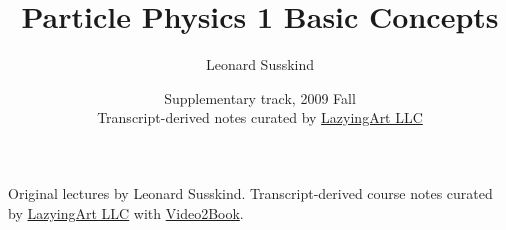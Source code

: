 \documentclass[11pt,oneside]{book}
\begin{document}
\frontmatter
\title{Particle Physics 1 Basic Concepts}
\author{Leonard Susskind}
\date{Supplementary track, 2009 Fall \\ Transcript-derived notes curated by \href{https://lazying.art}{LazyingArt LLC}}
\maketitle
\begin{center}
\small Original lectures by Leonard Susskind. Transcript-derived course notes curated by \href{https://lazying.art}{LazyingArt LLC} with \href{https://github.com/lachlanchen/Video2Book}{Video2Book}.
\end{center}
\clearpage
\tableofcontents
\mainmatter










\end{document}
